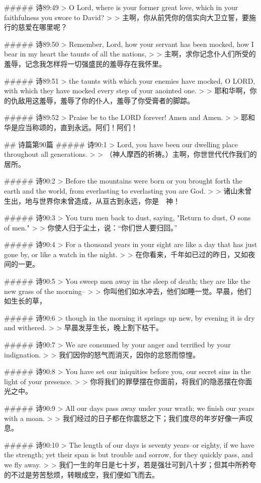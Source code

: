 ##### 诗89:49
> O Lord, where is your former great love, which in your faithfulness you swore to David?
>
> 主啊，你从前凭你的信实向大卫立誓，要施行的慈爱在哪里呢？


##### 诗89:50
> Remember, Lord, how your servant has been mocked, how I bear in my heart the taunts of all the nations,
>
> 主啊，求你记念仆人们所受的羞辱，记念我怎样将一切强盛民的羞辱存在我怀里。


##### 诗89:51
> the taunts with which your enemies have mocked, O LORD, with which they have mocked every step of your anointed one.
>
> 耶和华啊，你的仇敌用这羞辱，羞辱了你的仆人，羞辱了你受膏者的脚踪。


##### 诗89:52
> Praise be to the LORD forever! Amen and Amen.
>
> 耶和华是应当称颂的，直到永远。阿们！阿们！


## 诗篇第90篇
##### 诗90:1
> Lord, you have been our dwelling place throughout all generations.
>
> （神人摩西的祈祷。）主啊，你世世代代作我们的居所。


##### 诗90:2
> Before the mountains were born or you brought forth the earth and the world, from everlasting to everlasting you are God.
>
> 诸山未曾生出，地与世界你未曾造成，从亘古到永远，你是　神！


##### 诗90:3
> You turn men back to dust, saying, "Return to dust, O sons of men."
>
> 你使人归于尘土，说：“你们世人要归回。”


##### 诗90:4
> For a thousand years in your sight are like a day that has just gone by, or like a watch in the night.
>
> 在你看来，千年如已过的昨日，又如夜间的一更。


##### 诗90:5
> You sweep men away in the sleep of death; they are like the new grass of the morning--
>
> 你叫他们如水冲去，他们如睡一觉。早晨，他们如生长的草，


##### 诗90:6
> though in the morning it springs up new, by evening it is dry and withered.
>
> 早晨发芽生长，晚上割下枯干。


##### 诗90:7
> We are consumed by your anger and terrified by your indignation.
>
> 我们因你的怒气而消灭，因你的忿怒而惊惶。


##### 诗90:8
> You have set our iniquities before you, our secret sins in the light of your presence.
>
> 你将我们的罪孽摆在你面前，将我们的隐恶摆在你面光之中。


##### 诗90:9
> All our days pass away under your wrath; we finish our years with a moan.
>
> 我们经过的日子都在你震怒之下；我们度尽的年岁好像一声叹息。


##### 诗90:10
> The length of our days is seventy years--or eighty, if we have the strength; yet their span is but trouble and sorrow, for they quickly pass, and we fly away.
>
> 我们一生的年日是七十岁，若是强壮可到八十岁；但其中所矜夸的不过是劳苦愁烦，转眼成空，我们便如飞而去。


